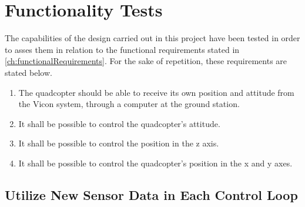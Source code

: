 \chapter{Functionality Tests}
The capabilities of the design carried out in this project have been tested in order to asses them in relation to the functional requirements stated in \autoref{ch:functionalRequirements}. 
For the sake of repetition, these requirements are stated below.
\begin{enumerate}[label=\textbf{\arabic*})]
\item {The quadcopter should be able to receive its own position and attitude from the Vicon system, through a computer at the ground station.}
\item {It shall be possible to control the quadcopter's attitude.}
\item {It shall be possible to control the position in the z axis.}
\item {It shall be possible to control the quadcopter's position in the x and y axes.}
\end{enumerate}

\section{Utilize New Sensor Data in Each Control Loop}\label{sec:NetworkTest}


